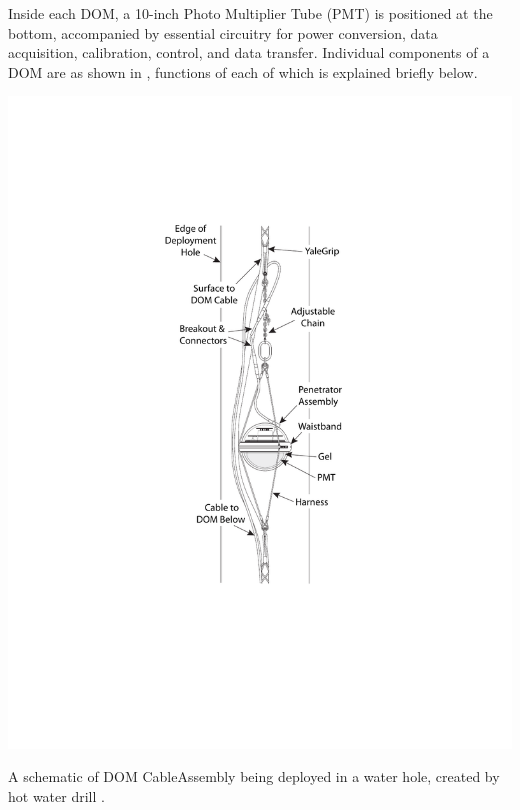 Inside each DOM, a 10-inch Photo Multiplier Tube (PMT) is positioned at the bottom, accompanied by essential circuitry for power conversion, data acquisition, calibration, control, and data transfer. Individual components of a DOM are as shown in , functions of each of which is explained briefly below.
\begin{marginfigure}
    \includegraphics{./figures/nu_in_icecube/domfig2a-CableAssembly.pdf}
    \caption{A schematic of DOM CableAssembly being deployed in a water hole, created by hot water drill \cite{Aartsen_2017}.}
\end{marginfigure}

